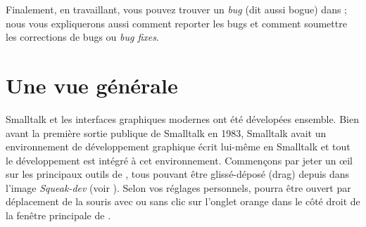 \documentclass[a4paper,10pt,twoside]{book}
\begin{document}
Finalement, en travaillant, vous pouvez trouver un \emph{bug} (dit aussi bogue) dans \Squeak;
nous vous expliquerons aussi comment reporter les bugs
et comment soumettre les corrections de bugs ou \emph{bug fixes}.

\section{Une vue g\'en\'erale}
\label{sec:overview}

Smalltalk et les interfaces graphiques modernes ont \'et\'e d\'evelop\'ees ensemble.
Bien avant la premi\`ere sortie publique de Smalltalk en 1983, Smalltalk
avait un environnement de d\'eveloppement graphique écrit lui-même en Smalltalk et
tout le d\'eveloppement est intégré à cet environnement.
Commen\c{c}ons par jeter un \oe il sur les principaux outils de \Squeak,
tous pouvant \^etre gliss\'e-d\'epos\'e (drag) depuis \toolsflapind
dans l'image \emph{Squeak-dev} (voir ).
Selon vos r\'eglages personnels, \toolsflap{} pourra \^etre ouvert
par d\'eplacement de la souris avec ou sans clic sur l'onglet orange
dans le c\^ot\'e droit de la fen\^etre principale de \Squeak.
\end{document}
